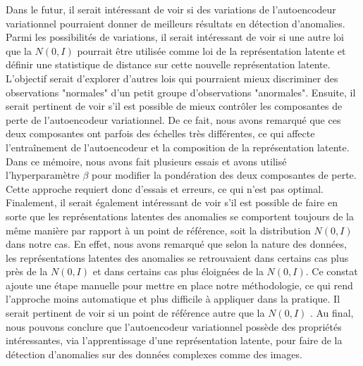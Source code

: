 Dans le futur, il serait intéressant de voir si des variations de l'autoencodeur variationnel pourraient donner de meilleurs résultats en détection d'anomalies. Parmi les possibilités de variations, il serait intéressant de voir si une autre loi que la $N(0,I)$ pourrait être utilisée comme loi \DIFdelbegin {}\DIFdelend \DIFaddbegin \textit{} \DIFaddend de la représentation latente et définir une statistique de distance sur cette nouvelle représentation latente. L'objectif serait d'explorer d'autres lois qui pourraient mieux discriminer des observations "normales" d'un petit groupe d'observations "anormales". Ensuite, il serait pertinent de voir s'il est possible de mieux contrôler les \DIFdelbegin {}\DIFdelend \DIFaddbegin {}\DIFaddend composantes de perte de l'autoencodeur variationnel. De ce fait, nous avons remarqué que ces deux composantes ont parfois des échelles très différentes, ce qui affecte l'entraînement de l'autoencodeur et la composition de la représentation latente. Dans ce mémoire, nous avons fait plusieurs essais et avons utilisé l'hyperparamètre $\beta$  pour modifier la pondération des deux composantes de perte. Cette approche requiert donc \DIFdelbegin {}\DIFdelend \DIFaddbegin {}\DIFaddend d'essais et erreurs, ce qui n'est pas optimal. Finalement, il serait également intéressant de voir s'il est possible de faire en sorte que les représentations latentes des anomalies se comportent toujours de la même manière par rapport à un point de référence, soit la distribution $N(0,I)$ dans notre cas. En effet, nous avons remarqué que selon la nature des données, les représentations latentes des anomalies se retrouvaient dans certains cas plus près de la $N(0,I)$ et dans certains cas  plus éloignées de la $N(0,I)$. Ce constat ajoute une étape manuelle pour mettre en place notre méthodologie, ce qui rend l'approche moins automatique et plus difficile à appliquer dans la pratique. Il serait \DIFdelbegin {}\DIFdelend pertinent de voir si un \DIFdelbegin {}\DIFdelend point de référence \DIFdelbegin \DIFdel{, }\DIFdelend autre que la $N(0,I)$ \DIFdelbegin {}\DIFdelend \DIFaddbegin {}\DIFaddend . Au final, nous pouvons conclure que l'autoencodeur variationnel possède des propriétés intéressantes, via l'apprentissage d'une représentation latente, pour faire de la détection d'anomalies sur des données complexes comme des images.


